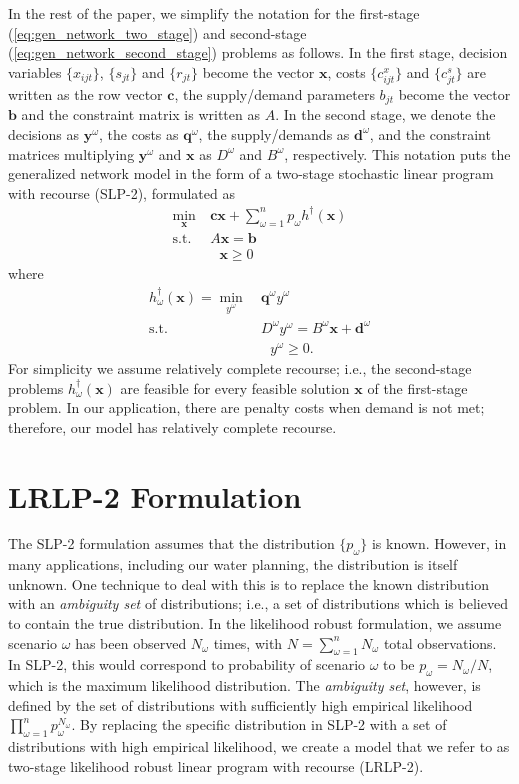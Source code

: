 \documentclass[11pt]{article}
\newcommand{\x}{\mathbf{x}}
\newcommand{\y}{\mathbf{y}}
\renewcommand{\c}{\mathbf{c}}
\newcommand{\q}{\mathbf{q}}
\renewcommand{\b}{\mathbf{b}}
\renewcommand{\d}{\mathbf{d}}
\newcommand{\st}{\mbox{s.t.}}
\begin{document}
In the rest of the paper, we simplify the notation for the first-stage (\ref{eq:gen_network_two_stage}) and second-stage (\ref{eq:gen_network_second_stage}) problems as follows.
In the first stage, decision variables $\{x_{ijt}\}$, $\{s_{jt}\}$ and $\{r_{jt}\}$ become the vector $\x$, costs $\{c_{ijt}^x\}$ and $\{c_{jt}^s\}$ are written as the row vector $\c$, the supply/demand parameters $b_{jt}$ become the vector $\b$ and the constraint matrix is written as $A$.
In the second stage, we denote the decisions as $\y^\omega$, the costs as $\q^\omega$, the supply/demands as $\d^\omega$, and the constraint matrices multiplying $\y^\omega$ and $\x$ as $D^\omega$ and $B^\omega$, respectively.
This notation puts the generalized network model in the form of a two-stage stochastic linear program with recourse (SLP-2), formulated as
\begin{align}
	\min_\x \ & \c\x + \sum_{\omega=1}^n p_\omega h^\dagger(\x) \label{eq:slp_first_stage} \\
	\st \ & A\x = \b \nonumber  \\
	&\ \ \ \x \geq 0 \nonumber
\end{align}
where
\begin{align}
	h^\dagger_\omega(\x) = \min_{y^\omega} \ & \q^\omega y^\omega \label{eq:slp_second_stage} \\
	\st \ & D^\omega y^\omega = B^\omega \x + \d^\omega \nonumber \\
	& \ \ \ y^\omega \geq 0. \nonumber
\end{align}
For simplicity we assume relatively complete recourse; i.e., the second-stage problems $h^\dagger_\omega(\x)$ are feasible for every feasible solution $\x$ of the first-stage problem. In our application, there are penalty costs when demand is not met; therefore, our model has relatively complete recourse. 


\section{LRLP-2 Formulation}
\label{sec:lrlp2}

The SLP-2 formulation assumes that the distribution $\{p_\omega\}$ is known.
However, in many applications, including our water planning, the distribution is itself unknown.
One technique to deal with this is to replace the known distribution with an {\it ambiguity set} of distributions; i.e., a set of distributions which is believed to contain the true distribution.
In the likelihood robust formulation, we assume scenario $\omega$ has been observed $N_\omega$ times, with $N = \sum_{\omega=1}^n N_\omega$ total observations. 
In SLP-2, this would correspond to probability of scenario $\omega$ to be $p_\omega = N_\omega / N$, which is the maximum likelihood distribution. 
The {\it ambiguity set}, however, is defined by the set of distributions with sufficiently high empirical likelihood $\prod_{\omega=1}^n p_\omega^{N_\omega}$. 
By replacing the specific distribution in SLP-2 with a set of distributions with  high empirical likelihood, we create a model that we refer to as two-stage likelihood robust linear program with recourse (LRLP-2).
\end{document}
